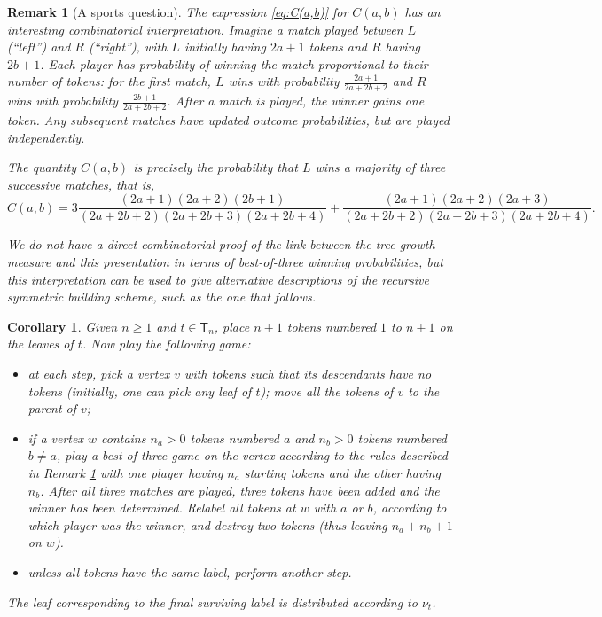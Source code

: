 \documentclass[11pt]{article}
\renewcommand{\geq}{\geqslant}
\newcommand{\sT}{\mathsf{T}} %
\newtheorem{cor}[thm]{Corollary}
\newtheorem{rem}[thm]{Remark}
\begin{document}
\begin{rem}[A sports question] \label{rem:best of three}
The expression \eqref{eq:C(a,b)} for $C(a,b)$ has an interesting combinatorial interpretation. Imagine a match played between $L$ (``left'') and $R$ (``right''), with $L$ initially having $2a+1$ tokens and $R$ having $2b+1$. Each player has probability of winning the match proportional to their number of tokens: for the first match, $L$ wins with probability $\frac{2a+1}{2a+2b+2}$ and $R$ wins with probability $\frac{2b+1}{2a+2b+2}$. After a match is played, the winner gains one token. Any subsequent matches have updated outcome probabilities, but are played independently.

The quantity $C(a,b)$ is precisely the probability that $L$ wins a majority of three successive matches, that is,
$$C(a,b)=3\frac{(2a+1)(2a+2)(2b+1)}{(2a+2b+2)(2a+2b+3)(2a+2b+4)}+\frac{(2a+1)(2a+2)(2a+3)}{(2a+2b+2)(2a+2b+3)(2a+2b+4)}.$$

We do not have a direct combinatorial proof of the link between the tree growth measure and this presentation in terms of best-of-three winning probabilities, but this interpretation can be used to give alternative descriptions of the recursive symmetric building scheme, such as the one that follows.
\end{rem}

\begin{cor}
Given $n\geq 1$ and $t\in\sT_n$, place $n+1$ tokens numbered $1$ to $n+1$ on the leaves of $t$. Now play the following game:
\begin{itemize}
\item at each step, pick a vertex $v$ with tokens such that its descendants have no tokens (initially, one can pick any leaf of $t$); move all the tokens of $v$ to the parent of $v$;
\item if a vertex $w$ contains $n_a>0$ tokens numbered $a$ and $n_b>0$ tokens numbered $b\neq a$, play a best-of-three game on the vertex according to the rules described in Remark \ref{rem:best of three} with one player having $n_a$ starting tokens and the other having $n_b$. After all three matches are played, three tokens have been added and the winner has been determined. Relabel all tokens at $w$ with $a$ or $b$, according to which player was the winner, and destroy two tokens (thus leaving $n_a+n_b+1$ on $w$).
\item unless all tokens have the same label, perform another step.
\end{itemize}

The leaf corresponding to the final surviving label is distributed according to $\nu_t$.
\end{cor}
\end{document}
